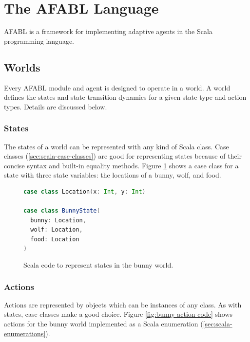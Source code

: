 \section{The AFABL Language}

AFABL is a framework for implementing adaptive agents in the Scala programming language.

\subsection{Worlds}

Every AFABL module and agent is designed to operate in a world. A world defines the states and state transition dynamics for a given state type and action types. Details are discussed below.

\subsubsection{States}

The states of a world can be represented with any kind of Scala class. Case classes (\ref{sec:scala-case-classes}) are good for representing states because of their concise syntax and built-in equality methods. Figure \ref{fig:bunny-state-code} shows a case class for a state with three state variables: the locations of a bunny, wolf, and food.

\begin{figure}[h]
\begin{center}

\begin{lstlisting}[language=Scala]
case class Location(x: Int, y: Int)

case class BunnyState(
  bunny: Location,
  wolf: Location,
  food: Location
)
\end{lstlisting}

\caption{Scala code to represent states in the bunny world.}
\end{center}
\label{fig:bunny-state-code}
\end{figure}

\subsubsection{Actions}

Actions are represented by objects which can be instances of any class. As with states, case classes make a good choice. Figure \ref{fig:bunny-action-code} shows actions for the bunny world implemented as a Scala enumeration (\ref{sec:scala-enumerations}).

